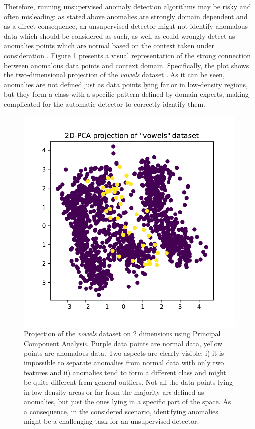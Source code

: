 Therefore, running unsupervised anomaly detection algorithms may be risky and often misleading: as stated above anomalies are strongly domain dependent and as a direct consequence, an unsupervised detector might not identify anomalous data which should be considered as such, as well as could wrongly detect as anomalies points which are normal based on the context taken under consideration \cite{das2016incorporating}. Figure \ref{anomalyvsoutlier} presents a visual representation of the strong connection between anomalous data points and context domain. Specifically, the plot shows the two-dimensional projection of the \textit{vowels} dataset \cite{Rayana}. As it can be seen, anomalies are not defined just as data points lying far or in low-density regions, but they form a class with a specific pattern defined by domain-experts, making complicated for the automatic detector to correctly identify them.

\begin{figure}
    \centering
    \includegraphics[scale=0.6]{vowelsPCA.pdf}
    \caption{Projection of the \emph{vowels} dataset on 2 dimensions using Principal Component Analysis. Purple data points are normal data, yellow points are anomalous data. Two aspects are clearly visible: i) it is impossible to separate anomalies from normal data with only two features and ii) anomalies tend to form a different class and might be quite different from general outliers. Not all the data points lying in low density areas or far from the majority are defined as anomalies, but just the ones lying in a specific part of the space. 
   As a consequence, in the considered scenario, identifying anomalies might be a challenging task for an unsupervised detector.}
    \label{anomalyvsoutlier}
\end{figure}


